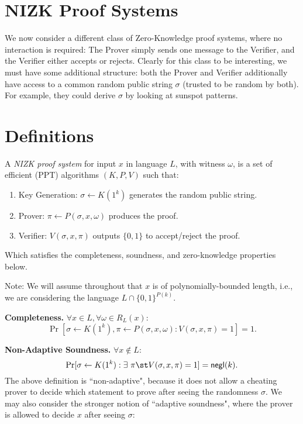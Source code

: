 
\newcommand{\rgets}{\overset{\$}{\gets}}
\section{NIZK Proof Systems}
We now consider a different class of Zero-Knowledge proof systems, where no
interaction is required: The Prover simply sends one message to the Verifier,
and the Verifier either accepts or rejects. Clearly for this class to be
interesting, we must have some additional structure:
both the Prover and Verifier additionally have access to a common random public string
$\sigma$ (trusted to be random by both). For example, they could derive $\sigma$
by looking at sunspot patterns. 

\section{Definitions}

\begin{definition}
    A \emph{NIZK proof system} for input $x$ in language $L$, with witness $\omega$, is a set of
efficient (PPT) algorithms $(K, P, V)$ such that:
\begin{enumerate}
    \item Key Generation: $\sigma \gets K(1^k)$ generates the random public string.
    \item Prover: $\pi \gets P(\sigma, x, \omega)$ produces the proof.
    \item Verifier: $V(\sigma, x, \pi)$ outputs $\{0, 1\}$ to accept/reject the proof.
\end{enumerate}
Which satisfies the completeness, soundness, and zero-knowledge properties below.
\end{definition}
Note: We will assume throughout that $x$ is of polynomially-bounded length, i.e., we are
considering the language $L \cap \{0, 1\}^{P(k)}$.


\medskip
\noindent\textbf{Completeness.} $\forall x \in L, \forall \omega \in R_L(x)$:
    $$\Pr[\sigma \gets K(1^k), \pi \gets P(\sigma, x, \omega) : V(\sigma, x,
    \pi) = 1] = 1.$$
\DIFaddbegin {}\DIFaddend 

\medskip
\noindent\textbf{Non-Adaptive Soundness.} $\forall x \not\in L$:
    $$\Pr[\sigma \gets K(1^k): \exists~\pi \st V(\sigma, x, \pi)
    = 1] = \mathsf{negl}(k).$$
\DIFaddbegin {}\DIFaddend The above definition is ``non-adaptive", because it does not allow a cheating
prover to decide which statement to prove after seeing the randomness $\sigma$.
We may also consider the stronger notion of ``adaptive soundness", where the
prover is allowed to decide $x$ after seeing $\sigma$:

